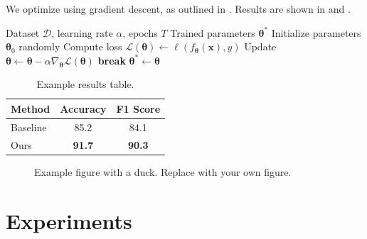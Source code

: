 \documentclass[10pt]{article}
\begin{document}
We optimize  using gradient descent, as outlined in . Results are shown in  and .

\begin{algorithm}[htbp]
    \caption{Example Training Procedure}
    \label{alg:training}
    \begin{algorithmic}[1]
        \Require Dataset $\mathcal{D}$, learning rate $\alpha$, epochs $T$
        \Ensure Trained parameters $\bm{\theta}^*$
        \State Initialize parameters $\bm{\theta}_0$ randomly
                \State Compute loss $\mathcal{L}(\bm{\theta}) \gets \ell(f_{\bm{\theta}}(\bm{x}), y)$
                \State Update $\bm{\theta} \gets \bm{\theta} - \alpha \nabla_{\bm{\theta}} \mathcal{L}(\bm{\theta})$
            \EndFor
                \State \textbf{break}
            \EndIf
        \EndFor
        \State \Return $\bm{\theta}^* \gets \bm{\theta}$
    \end{algorithmic}
\end{algorithm}

\begin{table}
    \centering
    \begin{tabular}{lcc}
        \toprule
        Method & Accuracy & F1 Score \\
        \midrule
        Baseline & 85.2 & 84.1 \\
        Ours & \textbf{91.7} & \textbf{90.3} \\
        \bottomrule
    \end{tabular}
    \caption{Example results table.}
    \label{tab:results}
\end{table}

\begin{figure}
    \centering
    \caption{Example figure with a duck. Replace with your own figure.}
    \label{fig:example}
\end{figure}

\section{Experiments}
\end{document}
